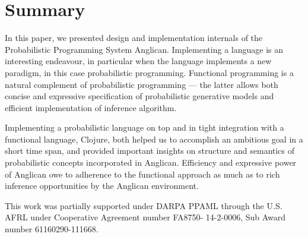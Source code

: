 \documentclass[preprint]{sigplanconf}
\begin{document}
\section{Summary}

In this paper, we presented design and implementation internals
of the Probabilistic Programming System Anglican. Implementing
a language is an interesting endeavour, in particular when the
language implements a new paradigm, in this case probabilistic
programming. Functional programming is a natural complement of
probabilistic programming --- the latter allows both concise and
expressive specification of probabilistic generative models and
efficient implementation of inference algorithm.

Implementing a probabilistic language on top and in tight
integration with a functional language, Clojure, both helped
us to accomplish an ambitious goal in a short time span, and
provided important insights on structure and semantics of
probabilistic concepts incorporated in Anglican. Efficiency
and expressive power of Anglican owe to adherence to the
functional approach as much as to rich inference opportunities
by the Anglican environment.

\acks

This work was partially supported under DARPA PPAML through the
U.S. AFRL under Cooperative Agreement number FA8750- 14-2-0006,
Sub Award number 61160290-111668.



\end{document}
